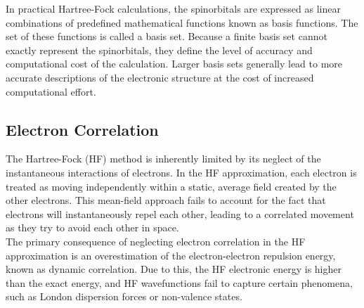 In practical Hartree-Fock calculations, the spinorbitals are expressed as linear combinations of predefined mathematical functions known as basis functions. The set of these functions is called a basis set. Because a finite basis set cannot exactly represent the spinorbitals, they define the level of accuracy and computational cost of the calculation. Larger basis sets generally lead to more accurate descriptions of the electronic structure at the cost of increased computational effort.\\

\subsection{Electron Correlation}
\label{subsec:electron_correlation}
The Hartree-Fock (HF) method is inherently limited by its neglect of the instantaneous interactions of electrons. In the HF approximation, each electron is treated as moving independently within a static, average field created by the other electrons. This mean-field approach fails to account for the fact that electrons will instantaneously repel each other, leading to a correlated movement as they try to avoid each other in space.\\

The primary consequence of neglecting electron correlation in the HF approximation is an overestimation of the electron-electron repulsion energy, known as dynamic correlation. Due to this, the HF electronic energy is higher than the exact energy, and HF wavefunctions fail to capture certain phenomena, such as London dispersion forces or non-valence states.\\

